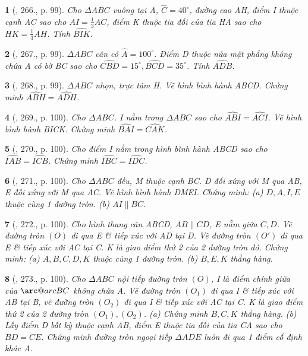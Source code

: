 \documentclass{article}
\makeatletter
\newcommand{\arc@char}{{\usefont{U}{tipa}{m}{n}\symbol{62}}}%
\newcommand{\arc}[1]{\mathpalette\arc@arc{#1}}
\newcommand{\arc@arc}[2]{%
	\sbox0{$\m@th#1#2$}%
	\vbox{
		\hbox{\resizebox{\wd0}{\height}{\arc@char}}
		\nointerlineskip
		\box0
	}%
}
\newtheorem{baitoan}{}
\makeatother
\begin{document}
\begin{baitoan}[\cite{Binh_Toan_9_tap_2}, 266., p. 99]
	Cho $\Delta ABC$ vuông tại A, $\widehat{C} = 40^\circ$, đường cao AH, điểm I thuộc cạnh AC sao cho $AI = \frac{1}{3}AC$, điểm K thuộc tia đối của tia HA sao cho $HK = \frac{1}{3}AH$. Tính $\widehat{BIK}$.
\end{baitoan}

\begin{baitoan}[\cite{Binh_Toan_9_tap_2}, 267., p. 99]
	$\Delta ABC$ cân có $\widehat{A} = 100^\circ$. Điểm D thuộc nửa mặt phẳng không chứa A có bờ BC sao cho $\widehat{CBD} = 15^\circ,\widehat{BCD} = 35^\circ$. Tính $\widehat{ADB}$.
\end{baitoan}

\begin{baitoan}[\cite{Binh_Toan_9_tap_2}, 268., p. 99]
	$\Delta ABC$ nhọn, trực tâm H. Vẽ hình bình hành ABCD. Chứng minh $\widehat{ABH} = \widehat{ADH}$.
\end{baitoan}

\begin{baitoan}[\cite{Binh_Toan_9_tap_2}, 269., p. 100]
	Cho $\Delta ABC$. I nằm trong $\Delta ABC$ sao cho $\widehat{ABI} = \widehat{ACI}$. Vẽ hình bình hành BICK. Chứng minh $\widehat{BAI} = \widehat{CAK}$.
\end{baitoan}

\begin{baitoan}[\cite{Binh_Toan_9_tap_2}, 270., p. 100]
	Cho điểm I nằm trong hình bình hành ABCD sao cho $\widehat{IAB} = \widehat{ICB}$. Chứng minh $\widehat{IBC} = \widehat{IDC}$.
\end{baitoan}

\begin{baitoan}[\cite{Binh_Toan_9_tap_2}, 271., p. 100]
	Cho $\Delta ABC$ đều, M thuộc cạnh BC. D đối xứng với M qua AB, E đối xứng với M qua AC. Vẽ hình bình hành DMEI. Chứng minh: (a) $D,A,I,E$ thuộc cùng 1 đường tròn. (b) $AI\parallel BC$.
\end{baitoan}

\begin{baitoan}[\cite{Binh_Toan_9_tap_2}, 272., p. 100]
	Cho hình thang cân ABCD, $AB\parallel CD$, E nằm giữa $C,D$. Vẽ đường tròn $(O)$ đi qua E \& tiếp xúc với AD tại D. Vẽ đường tròn $(O')$ đi qua E \& tiếp xúc với AC tại C. K là giao điểm thứ 2 của 2 đường tròn đó. Chứng minh: (a) $A,B,C,D,K$ thuộc cùng 1 đường tròn. (b) $B,E,K$ thẳng hàng.
\end{baitoan}

\begin{baitoan}[\cite{Binh_Toan_9_tap_2}, 273., p. 100]
	Cho $\Delta ABC$ nội tiếp đường tròn $(O)$, I là điểm chính giữa của $\arc{BC}$ không chứa A. Vẽ đường tròn $(O_1)$ đi qua I \& tiếp xúc với AB tại B, vẽ đường tròn $(O_2)$ đi qua I \& tiếp xúc với AC tại C. K là giao điểm thứ 2 của 2 đường tròn $(O_1),(O_2)$. (a) Chứng minh $B,C,K$ thẳng hàng. (b) Lấy điểm D bất kỳ thuộc cạnh AB, điểm E thuộc tia đối của tia CA sao cho $BD = CE$. Chứng minh đường tròn ngoại tiếp $\Delta ADE$ luôn đi qua 1 điểm cố định khác A.
\end{baitoan}
\end{document}
